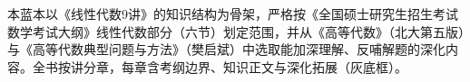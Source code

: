 \documentclass[11pt]{ctexart}
\begin{document}

\begin{fnote}[colback=cPrimaryL, colframe=cPrimary!45]
本蓝本以《线性代数9讲》的知识结构为骨架，严格按《全国硕士研究生招生考试数学考试大纲》线性代数部分（六节）划定范围，并从《高等代数》（北大第五版）与《高等代数典型问题与方法》（樊启斌）中选取能加深理解、反哺解题的深化内容。全书按讲分章，每章含考纲边界、知识正文与深化拓展（灰底框）。
\end{fnote}

\tocpage




















\end{document}
